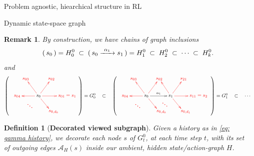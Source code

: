 \documentclass[11pt]{article}
\newtheorem{definition}[subsubsection]{Definition}
\newtheorem{remark}[subsubsection]{Remark}
\begin{document}
\begin{section}{Problem agnostic, hiearchical structure in RL}
\begin{subsection}{Dynamic state-space graph}
\begin{remark}
\normalfont
By construction, we have chains of graph inclusions
$$
(\ \!{\color{black} s_0}\ \!)=H^{0}_{0}\;\subset\;(\ \!{\color{black} s_0\xrightarrow{\ \alpha_{1}\ }s_1}\ \!)=H^{0}_{1}
\;\subset\; H^{0}_{2}
\;\subset\; \cdots
\;\subset\; H^{0}_{k}.
$$
and
$$
\scalebox{.9}{$
\left(\ \ 
{\color{red}
\begin{xy}
(0,0)*+{{\color{black} s_0 }}="s0";
(15,0)*+{ s_{01}=s_{1}\!\!\!\!\!\!\!\!\!\!\!\!\!\!\!\!\!}="s1";
(9,12)*+{s_{02}}="s02";
(-9,12)*+{s_{03}}="s03";
(-15,0)*+{s_{04}}="s04";
(-6,-6)*+{\pmb{\ddots}}="sd1";
(9,-11)*+{s_{0,d_{0}}\!\!\!\!\!}="sd";
{\ar@{->} "s0"; "s1"};
{\ar@{->} "s0"; "s02"};
{\ar@{->} "s0"; "s03"};
{\ar@{->} "s0"; "s04"};
{\ar@{->} "s0"; "sd"};
\end{xy}
}
\ \ \ \ \ \ \ \ \ 
\right)
=G^{0}_{0}
\quad\subset\quad
\left(\ \ 
{\color{red}
\begin{xy}
(0,0)*+{{\color{black} s_0 }}="s0";
(17,0)*+{{\color{black} s_1 }}="s1";
(9,12)*+{s_{02}}="s02";
(-9,12)*+{s_{03}}="s03";
(-15,0)*+{s_{04}}="s04";
(-6,-6)*+{\pmb{\ddots}}="sd1";
(9,-11)*+{s_{0,d_{0}}\!\!\!\!\!}="sd";
{\ar@[black]^{{\color{black} \alpha_{1}}} "s0"; "s1"};
{\ar@{->} "s0"; "s02"};
{\ar@{->} "s0"; "s03"};
{\ar@{->} "s0"; "s04"};
{\ar@{->} "s0"; "sd"};
(30,0)*+{s_{11}=s_{2}\!\!\!\!\!\!\!\!\!\!\!\!\!\!\!\!\!\!\!\!\!\!}="s2";
(26,12)*+{s_{21}}="s12";
(26,-11)*+{s_{0,d_{1}}\!\!\!\!\!}="s1d";
{\ar@{->} "s1"; "s12"};
{\ar@{->} "s1"; "s02"};
{\ar@{->} "s1"; "s2"};
{\ar@{->} "s1"; "s1d"};
(13,-5)*+{\pmb{\ddots}};
\end{xy}
}
\ \ \ \ \ \ \ \ \ \ \ \ 
\right)
=G^{0}_{1}
\quad\subset\quad\cdots$}
$$
\end{remark}

\begin{definition}[{\bf Decorated viewed subgraph}]
\normalfont
Given a history as in \eqref{eq: gamma history}, we decorate each node $s$ of $G^{0}_{t}$, at each time step $t$, with its set of outgoing edges $\mathcal{A}_{H}(s)$ {\em inside} our ambient, hidden state/action-graph $H$.
\end{definition}


\end{subsection}
\end{section}
\end{document}
